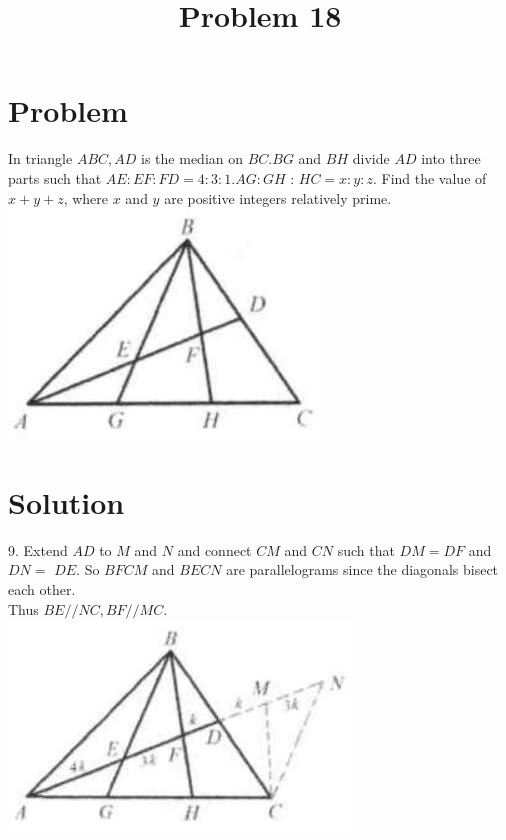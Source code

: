 \documentclass{article}
\title{Problem 18}
\date{}
\begin{document}
\maketitle

\section*{Problem}
In triangle \(A B C, A D\) is the median on \(B C . B G\) and \(B H\) divide \(A D\) into three parts such that \(A E: E F: F D=4: 3: 1 . A G: G H\) : \(H C=x: y: z\). Find the value of \(x+y+z\), where \(x\) and \(y\) are positive integers relatively prime.\\
\centering
\includegraphics[width=\textwidth]{images/129(2).jpg}

\section*{Solution}
9.
Extend \(A D\) to \(M\) and \(N\) and connect \(C M\) and \(C N\) such that \(D M=D F\) and \(D N=\) \(D E\). So \(B F C M\) and \(B E C N\) are parallelograms since the diagonals bisect each other.\\
Thus \(B E / / N C, B F / / M C\).\\
\centering
\includegraphics[width=\textwidth]{images/140(1).jpg}
\end{document}
